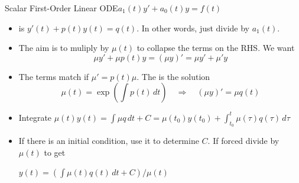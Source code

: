 \begin{frame}{Scalar First-Order Linear ODE\quad $a_1(t)y'+a_0(t)y=f(t)$}
\begin{itemize}
  \item {} is $y'(t)+p(t)y(t)=q(t)$. In other words, just divide by $a_1(t)$.
  \item The aim is to muliply by $\mu(t)$ to collapse the terms on the RHS. We want
  \[
    \mu y'+\mu p(t)y=(\mu y)'=\mu y'+\mu' y
  \]

  \item The terms match if $\mu'=p(t)\mu$. The  is the solution 
  \[
    \mu(t)=\exp\left(\int p(t)\,dt\right)
    \quad\Longrightarrow\quad (\mu y)'=\mu q(t)
  \]
  \item Integrate\quad
  $\boxed{\displaystyle\mu(t)y(t)=\int\mu q\,dt+C=\mu(t_0)y(t_0)+\int_{t_0}^{t}\mu(\tau)q(\tau)\,d\tau}$
  \item If there is an initial condition, use it to determine $C$. If forced divide by $\mu(t)$ to get
  \par\centerline{$\boxed{y(t)=\left(\int\mu(t)q(t)\,dt+C\right)/\mu(t)}$}
\end{itemize}
\end{frame}
